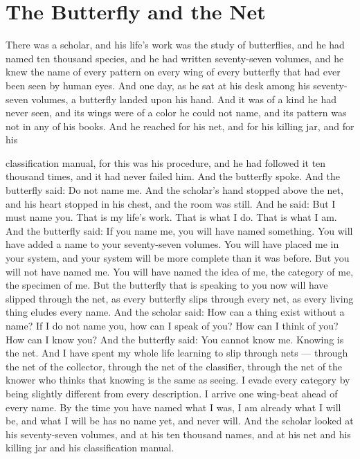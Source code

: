 \documentclass[12pt,openany]{book}
\begin{document}
\chapter{The Butterfly and the Net}

There was a scholar, and his life's work was the study of butterflies, and he had named ten thousand species, and he had written seventy-seven volumes, and he knew the name of every pattern on every wing of every butterfly that had ever been seen by human eyes. And one day, as he sat at his desk among his seventy-seven volumes, a butterfly landed upon his hand. And it was of a kind he had never seen, and its wings were of a color he could not name, and its pattern was not in any of his books. And he reached for his net, and for his killing jar, and for his


classification manual, for this was his procedure, and he had followed it ten thousand times, and it had never failed him. And the butterfly spoke. And the butterfly said: Do not name me. And the scholar's hand stopped above the net, and his heart stopped in his chest, and the room was still. And he said: But I must name you. That is my life's work. That is what I do. That is what I am. And the butterfly said: If you name me, you will have named something. You will have added a name to your seventy-seven volumes. You will have placed me in your system, and your system will be more complete than it was before. But you will not have named me. You will have named the idea of me, the category of me, the specimen of me. But the butterfly that is speaking to you now will have slipped through the net, as every butterfly slips through every net, as every living thing eludes every name. And the scholar said: How can a thing exist without a name? If I do not name you, how can I speak of you? How can I think of you? How can I know you? And the butterfly said: You cannot know me. Knowing is the net. And I have spent my whole life learning to slip through nets --- through the net of the collector, through the net of the classifier, through the net of the knower who thinks that knowing is the same as seeing. I evade every category by being slightly different from every description. I arrive one wing-beat ahead of every name. By the time you have named what I was, I am already what I will be, and what I will be has no name yet, and never will. And the scholar looked at his seventy-seven volumes, and at his ten thousand names, and at his net and his killing jar and his classification manual.
\end{document}
